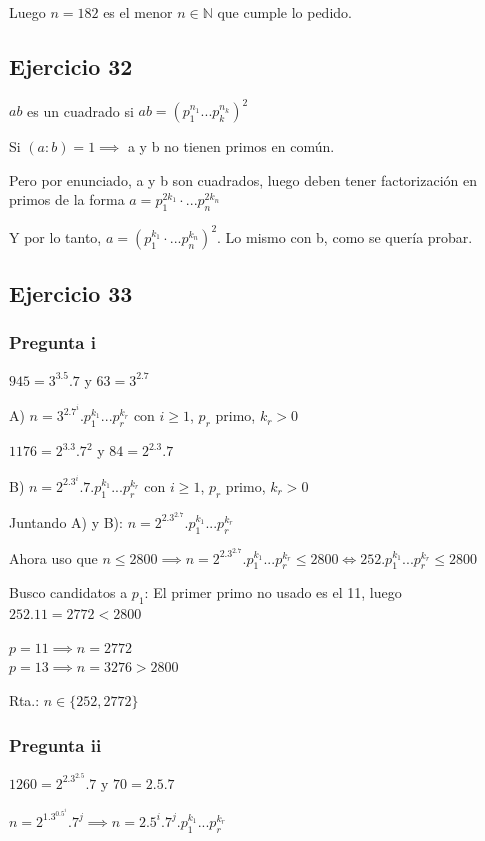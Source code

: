 Luego $ n = 182 $ es el menor $ n \in \mathbb{N} $ que cumple lo pedido.

\subsection{Ejercicio 32}
$ab$ es un cuadrado si $ ab = (p_1^{n_1}...p_k^{n_k})^2 $

Si $ (a:b) = 1 \implies $ a y b no tienen primos en común.

Pero por enunciado, a y b son cuadrados, luego deben tener factorización en primos de la forma $ a = p_1^{2k_1} \cdot ... p_n^{2k_n} $

Y por lo tanto, $ a = (p_1^{k_1} \cdot ... p_n^{k_n})^2 $. Lo mismo con b, como se quería probar.

\subsection{Ejercicio 33}
\subsubsection{Pregunta i}

$ 945 = 3^3.5.7 $ y $ 63 = 3^2.7$

A) $ n = 3^2.7^i.p_1^{k_1}...p_r^{k_r} $ con $ i \geq 1 $, $ p_r $ primo, $ k_r > 0 $

$ 1176 = 2^3.3.7^2 $ y $ 84 = 2^2.3.7 $

B) $ n = 2^2.3^i.7.p_1^{k_1}...p_r^{k_r} $ con $ i \geq 1 $, $ p_r $ primo, $ k_r > 0 $

Juntando A) y B): $ n = 2^2.3^2.7.p_1^{k_1}...p_r^{k_r} $

Ahora uso que $ n \leq 2800 \implies n = 2^2.3^2.7.p_1^{k_1}...p_r^{k_r} \leq 2800 \iff 252.p_1^{k_1}...p_r^{k_r} \leq 2800 $

Busco candidatos a $ p_1 $: El primer primo no usado es el 11, luego $ 252.11 = 2772 < 2800 $

$ p = 11 \implies n = 2772 $\\
$ p = 13 \implies n = 3276 > 2800 $

Rta.: $ n\in \{ 252, 2772 \} $

\subsubsection{Pregunta ii}
$ 1260 = 2^2.3^2.5.7 $ y $ 70 = 2.5.7 $

$ n = 2^1.3^0.5^i.7^j \implies n = 2.5^i.7^j.p_1^{k_1}...p_r^{k_r} $

